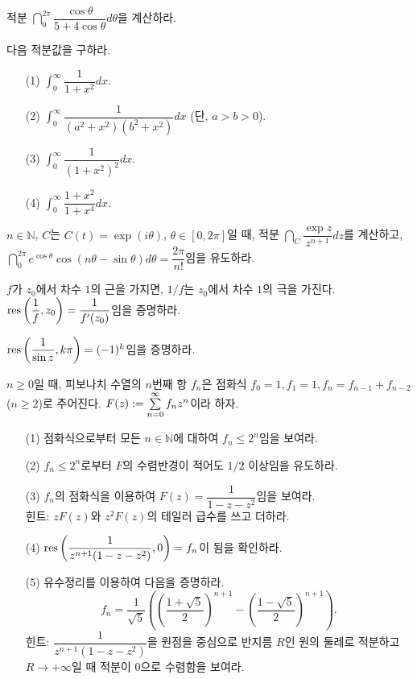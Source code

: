 \begin{salt_exercise}\label{ex-4-41}
적분 $\dint_0^{2\pi} \dfrac{\cos \theta}{5 + 4\cos\theta}d\theta$을 계산하라.
\end{salt_exercise}

\begin{salt_exercise}\label{ex-4-42}
다음 적분값을 구하라.
\begin{itemize}
\item[(1)] $\int_0^\infty \dfrac1{1+x^2} dx$.
\item[(2)] $\int_0^\infty \dfrac1{(a^2+x^2)(b^2+x^2)}dx$ (단, $a>b>0$).
\item[(3)] $\int_0^\infty \dfrac1{(1+x^2)^2}dx$.
\item[(4)] $\int_0^\infty \dfrac{1+x^2}{1+x^4}dx$.
\end{itemize}
\end{salt_exercise}

\begin{salt_exercise}\label{ex-4-43}
$n\in\mathbb N$, $C$는 $C(t)=\exp(i\theta)$, $\theta \in [0,2\pi]$일 때,
적분 $\dint_C \dfrac{\exp z}{z^{n+1}}dz$를 계산하고,
$\dint_0^{2\pi} e^{\cos\theta}\cos(n\theta - \sin \theta)d\theta = \dfrac{2\pi}{n!}$임을
유도하라.
\end{salt_exercise}

\begin{salt_exercise}\label{ex-4-44}
$f$가 $z_0$에서 차수 $1$의 근을 가지면, $1/f$는 $z_0$에서 차수 $1$의 극을 가진다.
$\mathop{\mathrm{res}}\left(\displaystyle\frac1f, z_0\right) = \displaystyle\frac1{f'(z_0)}$임을 증명하라.
\end{salt_exercise}

\begin{salt_exercise}\label{ex-4-45}
$\mathop{\mathrm{res}}\left(\displaystyle\frac1{\sin z}, k\pi\right) = (-1)^k$임을 증명하라.
\end{salt_exercise}

\begin{salt_exercise}\label{ex-4-46}
$n\ge0$일 때, 피보나치 수열의 $n$번째 항 $f_n$은 
점화식 $f_0=1, f_1=1, f_n = f_{n-1} + f_{n-2}$ ($n\ge2$)로 주어진다.
$F(z):= \sum\limits_{n=0}^\infty f_nz^n$이라 하자.
\begin{itemize}
\item[(1)] 점화식으로부터 모든 $n\in\mathbb N$에 대하여 $f_n\le 2^n$임을 보여라.
\item[(2)] $f_n\le 2^n$로부터 $F$의 수렴반경이 적어도 $1/2$ 이상임을 유도하라.
\item[(3)] $f_n$의 점화식을 이용하여 $F(z) = \dfrac1{1-z-z^2}$임을 보여라. \\
힌트: $zF(z)$와 $z^2F(z)$의 테일러 급수를 쓰고 더하라.
\item[(4)] $\mathop{\mathrm{res}} \left( \displaystyle\frac1{z^{n+1}(1-z-z^2)}, 0\right)=f_n$이 됨을 확인하라.
\item[(5)] 유수정리를 이용하여 다음을 증명하라.
\[
f_n = \dfrac1{\sqrt{5}} \left( \left(\dfrac{1+\sqrt{5}}2\right)^{n+1}
- \left(\dfrac{1-\sqrt{5}}2\right)^{n+1} \right).
\]
힌트: $\dfrac1{z^{n+1}(1-z-z^2)}$을 원점을 중심으로 반지름  $R$인 원의 둘레로
적분하고 $R\to+\infty$일 때 적분이 $0$으로 수렴함을 보여라.
\end{itemize}
\end{salt_exercise}

